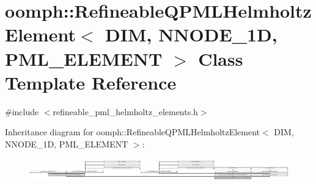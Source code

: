 \hypertarget{classoomph_1_1RefineableQPMLHelmholtzElement}{}\section{oomph\+:\+:Refineable\+Q\+P\+M\+L\+Helmholtz\+Element$<$ D\+IM, N\+N\+O\+D\+E\+\_\+1D, P\+M\+L\+\_\+\+E\+L\+E\+M\+E\+NT $>$ Class Template Reference}
\label{classoomph_1_1RefineableQPMLHelmholtzElement}


{\ttfamily \#include $<$refineable\+\_\+pml\+\_\+helmholtz\+\_\+elements.\+h$>$}

Inheritance diagram for oomph\+:\+:Refineable\+Q\+P\+M\+L\+Helmholtz\+Element$<$ D\+IM, N\+N\+O\+D\+E\+\_\+1D, P\+M\+L\+\_\+\+E\+L\+E\+M\+E\+NT $>$\+:\begin{figure}[H]
\begin{center}
\leavevmode
\includegraphics[height=0.997921cm]{classoomph_1_1RefineableQPMLHelmholtzElement}
\end{center}
\end{figure}
